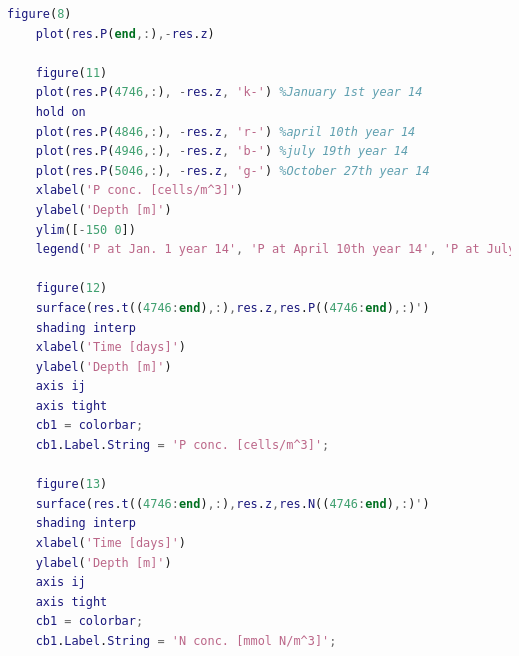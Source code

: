 \begin{lstlisting}[language=Matlab, caption = plotNPD.m - used to make most of the plots shown in this report]
    figure(8)
    plot(res.P(end,:),-res.z)
    
    figure(11)
    plot(res.P(4746,:), -res.z, 'k-') %January 1st year 14
    hold on
    plot(res.P(4846,:), -res.z, 'r-') %april 10th year 14
    plot(res.P(4946,:), -res.z, 'b-') %july 19th year 14
    plot(res.P(5046,:), -res.z, 'g-') %October 27th year 14
    xlabel('P conc. [cells/m^3]')
    ylabel('Depth [m]')
    ylim([-150 0])
    legend('P at Jan. 1 year 14', 'P at April 10th year 14', 'P at July 19th year 14','P at Oct. 27th year 14', 'Location', 'southeast')
    
    figure(12)
    surface(res.t((4746:end),:),res.z,res.P((4746:end),:)')
    shading interp
    xlabel('Time [days]')
    ylabel('Depth [m]')
    axis ij
    axis tight
    cb1 = colorbar;
    cb1.Label.String = 'P conc. [cells/m^3]';
    
    figure(13)
    surface(res.t((4746:end),:),res.z,res.N((4746:end),:)')
    shading interp
    xlabel('Time [days]')
    ylabel('Depth [m]')
    axis ij
    axis tight
    cb1 = colorbar;
    cb1.Label.String = 'N conc. [mmol N/m^3]';
\end{lstlisting}